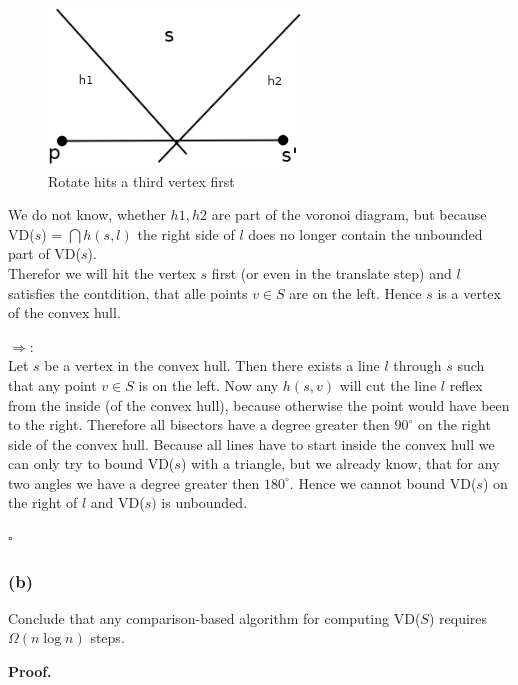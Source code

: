 \documentclass[11pt,a4paper,ngerman]{article}
\begin{document}
\begin{figure}[htbp]
    \centering
    \includegraphics[width=0.6\textwidth]{media/p1counter}
    \caption{Rotate hits a third vertex first}
    \label{alge:ueb9:p1counter}
\end{figure}

We do not know, whether $h1, h2$ are part of the voronoi diagram, but
because VD($s$) = $\bigcap h(s,l)$ the right side of $l$ does no longer contain
the unbounded part of VD($s$).\\

Therefor we will hit the vertex $s$ first (or even in the translate step)
and $l$ satisfies the contdition, that alle points $v \in S$ are on the left.
Hence $s$ is a vertex of the convex hull.

$\Rightarrow$:\\

Let $s$ be a vertex in the convex hull. Then there exists a line $l$ through
$s$ such that any point $v \in S$ is on the left. Now any $h(s,v)$
will cut the line $l$ reflex from the inside (of the convex hull), 
because otherwise the point would have been to the right. Therefore
all bisectors have a degree greater then $90^\circ$ on the right side
of the convex hull. Because all lines have to start inside the convex hull
we can only try to bound VD($s$) with a triangle, but we already know, that
for any two angles we have a degree greater then $180^\circ$.
Hence we cannot bound VD($s$) on the right of $l$ and VD($s)$ is unbounded.

\mbox{}\hfill$\square$

\subsubsection*{(b)}

Conclude that any comparison-based algorithm for computing VD($S$) requires
$\Omega (n \log n)$ steps.

\textbf{Proof.}\\
\end{document}
